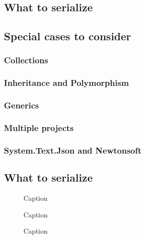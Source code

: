 \subsection{What to serialize}

\subsection{Special cases to consider}
\subsubsection{Collections}
\subsubsection{Inheritance and Polymorphism}
\subsubsection{Generics}


\subsubsection{Multiple projects}

\subsubsection{System.Text.Json and Newtonsoft}

\subsection{What to serialize}
\begin{figure}
    \centering
    
    \caption{Caption}
    \label{code:base_class_csharp}
\end{figure}

\begin{figure}
    \centering
    
    
    \caption{Caption}
    \label{code:base_class_java}
\end{figure}

\begin{figure}[H]
    \centering
    
    \caption{Caption}
    \label{code:base_class_typescript}
\end{figure}


